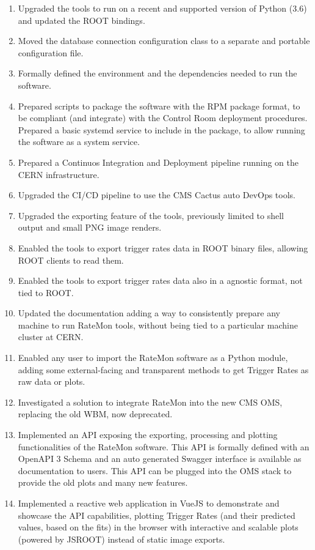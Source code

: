 \begin{enumerate}


        \item Upgraded the tools to run on a recent and supported version of Python (3.6) and updated the ROOT bindings.
        \item Moved the database connection configuration class to a separate and portable configuration file.
        \item Formally defined the environment and the dependencies needed to run the software.
        \item Prepared scripts to package the software with the RPM package format, to be compliant (and integrate) with the Control Room deployment procedures. Prepared a basic systemd service to include in the package, to allow running the software as a system service.
        \item Prepared a Continuos Integration and Deployment pipeline running on the CERN infrastructure.
        \item Upgraded the CI/CD pipeline to use the CMS Cactus \cite{DirkxCactus} auto DevOps tools.
        \item Upgraded the exporting feature of the tools, previously limited to shell output and small PNG image renders.
        \item Enabled the tools to export trigger rates data in ROOT binary files, allowing ROOT clients to read them.
        \item Enabled the tools to export trigger rates data also in a agnostic format, not tied to ROOT.
        \item Updated the documentation adding a way to consistently prepare any machine to run RateMon tools, without being tied to a particular machine cluster at CERN.
        \item Enabled any user to import the RateMon software as a Python module, adding some external-facing and transparent methods to get Trigger Rates as raw data or plots.
        \item Investigated a solution to integrate RateMon into the new CMS OMS, replacing the old WBM, now deprecated.
        \item Implemented an API exposing the exporting, processing and plotting functionalities of the RateMon software. This API is formally defined with an OpenAPI 3 Schema and an auto generated Swagger interface is available as documentation to users. This API can be plugged into the OMS stack to provide the old plots and many new features.
        \item Implemented a reactive web application in VueJS to demonstrate and showcase the API capabilities, plotting Trigger Rates (and their predicted values, based on the fits) in the browser with interactive and scalable plots (powered by JSROOT) instead of static image exports.

\end{enumerate}
